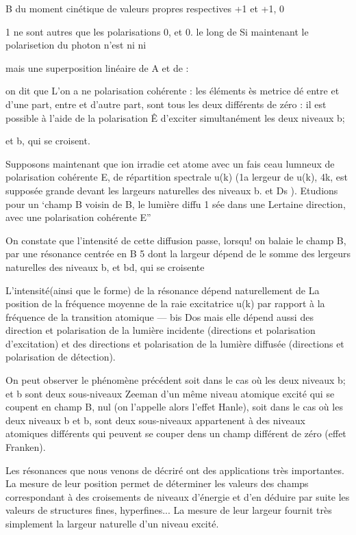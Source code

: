 B du moment cinétique de valeurs propres respectives +1 et +1,  0

1
ne sont autres que les polarisations 0, et 0. le long de 
Si maintenant le polarisetion du photon n'est ni  ni  

mais une superposition linéaire  de A et de  :

on dit que L'on a ne polarisation cohérente : les éléments ès metrice dé
 entre  et d'une part, entre  et 
d'autre part, sont tous les deux différents de zéro : il est possible à
l'aide de la polarisation Ê d'exciter simultanément les deux niveaux b;

et b, qui se croisent.

Supposons maintenant que ion irradie cet atome avec un fais
ceau lumneux de polarisation cohérente E, de répartition spectrale u(k)
(1a lergeur de u(k), 4k, est supposée grande devant les largeurs naturelles
des niveaux b. et Ds ). Etudions pour un ‘champ B voisin de B, le lumière diffu
1
sée dans une Lertaine direction, avec une polarisation cohérente E”

On constate que l'intensité de cette diffusion passe, lorsqu!
on balaie le champ B, par une résonance centrée en B 5 dont la largeur dépend
de le somme des lergeurs naturelles des niveaux b, et bd, qui se croisente

L'intensité(ainsi que le forme) de la résonance dépend naturellement de La position de la fréquence moyenne de la raie excitatrice u(k) par
rapport à la fréquence de la transition atomique  — bis Dos mais elle dépend
aussi des direction et polarisation de la lumière incidente (directions et
polarisation d'excitation) et des directions et polarisation de la lumière
diffusée (directions et polarisation de détection).

On peut observer le phénomène précédent soit dans le cas où les
deux niveaux b; et b sont deux sous-niveaux Zeeman d'un même niveau atomique
excité qui se coupent en champ B, nul (on l'appelle alors l'effet Hanle),
soit dans le cas où les deux niveaux b et b, sont deux sous-niveaux appartenent à des niveaux atomiques différents qui peuvent se couper dens un champ
différent de zéro (effet Franken).

Les résonances que nous venons de décriré ont des applications
très importantes. La mesure de leur position permet de déterminer les valeurs
des champs correspondant à des croisements de niveaux d'énergie et d'en déduire par suite les valeurs de structures fines, hyperfines... La mesure de leur
largeur fournit très simplement la largeur naturelle d'un niveau excité.

